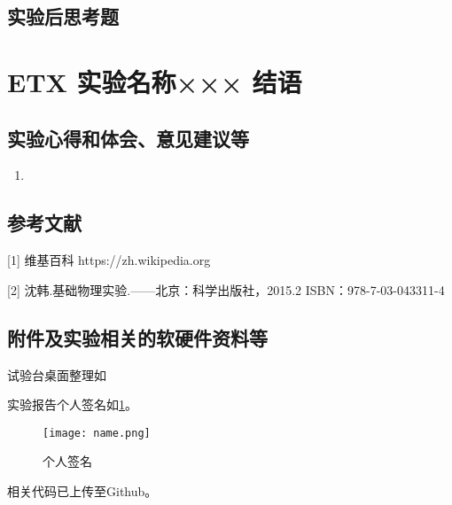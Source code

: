 \documentclass[dvipsnames, svgnames,a4paper,11pt]{article}
\begin{document}
	\subsubsection{}
	
	
	\subsection{实验后思考题}
	
	\begin{question}
		
	\end{question}
	
	\begin{question}
		
	\end{question}
	
	\begin{question}
		
	\end{question}
	
	
	
	\clearpage
	
	\section{ETX 实验名称××× \quad\heiti 结语}
	
	\subsection{实验心得和体会、意见建议等}
	\begin{enumerate}
		\item 
	\end{enumerate}
	
	\subsection{参考文献}
	[1] 维基百科 https://zh.wikipedia.org
	
	[2] 沈韩.基础物理实验.——北京：科学出版社，2015.2 ISBN：978-7-03-043311-4
	
	
	\subsection{附件及实验相关的软硬件资料等}
	试验台桌面整理如%
	
	实验报告个人签名如\cref{fig:name}。
	
	\begin{figure}[htbp]
		\centering
		\texttt{[image: name.png]}
		\caption{个人签名}
		\label{fig:name}
	\end{figure}
	
	
	相关代码已上传至Github。
	
	
	
\end{document}
